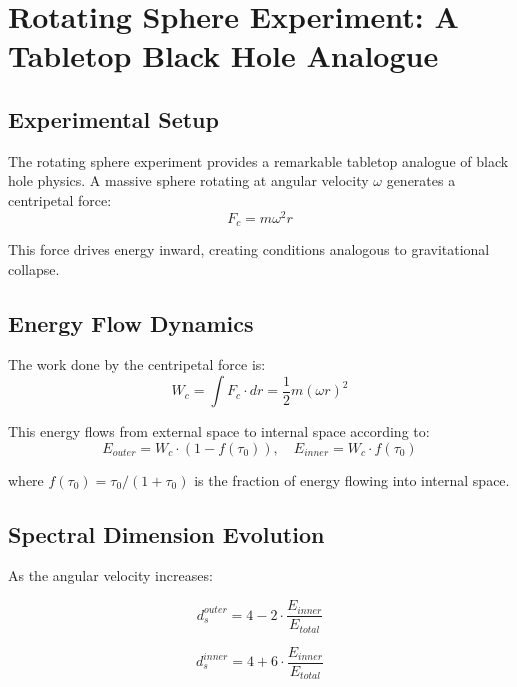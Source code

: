 \section{Rotating Sphere Experiment: A Tabletop Black Hole Analogue}
\label{app:rotating_sphere}

\subsection{Experimental Setup}

The rotating sphere experiment provides a remarkable tabletop analogue of black hole physics. A massive sphere rotating at angular velocity $\omega$ generates a centripetal force:
\begin{equation}
    F_c = m\omega^2 r
\end{equation}

This force drives energy inward, creating conditions analogous to gravitational collapse.

\subsection{Energy Flow Dynamics}

The work done by the centripetal force is:
\begin{equation}
    W_c = \int F_c \cdot dr = \frac{1}{2}m(\omega r)^2
    \label{eq:centripetal_work}
\end{equation}

This energy flows from external space to internal space according to:
\begin{equation}
    E_{outer} = W_c \cdot (1 - f(\tau_0)), \quad E_{inner} = W_c \cdot f(\tau_0)
\end{equation}

where $f(\tau_0) = \tau_0/(1 + \tau_0)$ is the fraction of energy flowing into internal space.

\subsection{Spectral Dimension Evolution}

As the angular velocity increases:

\begin{equation}
    d_s^{outer} = 4 - 2 \cdot \frac{E_{inner}}{E_{total}}
    \label{eq:outer_spectral}
\end{equation}

\begin{equation}
    d_s^{inner} = 4 + 6 \cdot \frac{E_{inner}}{E_{total}}
    \label{eq:inner_spectral}
\end{equation}

